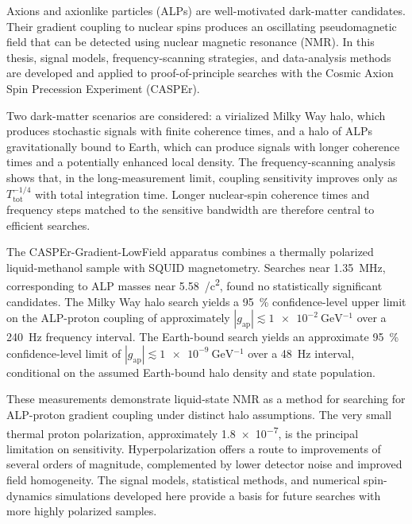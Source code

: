 
Axions and axionlike particles (ALPs) are well-motivated dark-matter candidates. Their gradient coupling to nuclear spins produces an oscillating pseudomagnetic field that can be detected using nuclear magnetic resonance (NMR).
In this thesis, signal models, frequency-scanning strategies, and data-analysis methods are developed and applied to proof-of-principle searches with the Cosmic Axion Spin Precession Experiment (CASPEr).

Two dark-matter scenarios are considered: a virialized Milky Way halo, which produces stochastic signals with finite coherence times, and a halo of ALPs gravitationally bound to Earth, which can produce signals with longer coherence times and a potentially enhanced local density.
The frequency-scanning analysis shows that, in the long-measurement limit, coupling sensitivity improves only as $T_\mathrm{tot}^{-1/4}$ with total integration time. Longer nuclear-spin coherence times and frequency steps matched to the sensitive bandwidth are therefore central to efficient searches.

The CASPEr-Gradient-LowField apparatus combines a thermally polarized liquid-methanol sample with SQUID magnetometry.
Searches near \SI{1.35}{\MHz}, corresponding to ALP masses near \SI{5.58}{\neV/c^2}, found no statistically significant candidates.
The Milky Way halo search yields a \SI{95}{\percent} confidence-level upper limit on the ALP-proton coupling of approximately $|g_\mathrm{ap}|\lesssim\SI{1e-2}{\GeV^{-1}}$ over a \SI{240}{\Hz} frequency interval.
The Earth-bound search yields an approximate \SI{95}{\percent} confidence-level limit of $|g_\mathrm{ap}|\lesssim\SI{1e-9}{\GeV^{-1}}$ over a \SI{48}{\Hz} interval, conditional on the assumed Earth-bound halo density and state population.

These measurements demonstrate liquid-state NMR as a method for searching for ALP-proton gradient coupling under distinct halo assumptions.
The very small thermal proton polarization, approximately \num{1.8e-7}, is the principal limitation on sensitivity. Hyperpolarization offers a route to improvements of several orders of magnitude, complemented by lower detector noise and improved field homogeneity.
The signal models, statistical methods, and numerical spin-dynamics simulations developed here provide a basis for future searches with more highly polarized samples.
